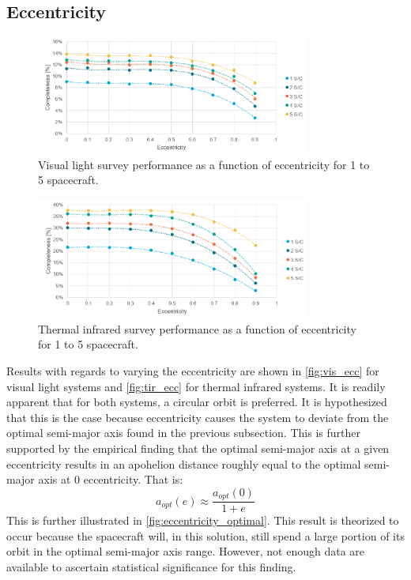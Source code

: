 \subsection{Eccentricity}
\begin{figure}[htbp]
 \centering
 \includegraphics[width=0.8\textwidth]{img/vis_ecc.png}
 \caption{Visual light survey performance as a function of eccentricity for 1 to 5 spacecraft.}
 \label{fig:vis_ecc}
\end{figure}

\begin{figure}[htbp]
 \centering
 \includegraphics[width=0.8\textwidth]{img/tir_ecc.png}
 \caption{Thermal infrared survey performance as a function of eccentricity for 1 to 5 spacecraft.}
 \label{fig:tir_ecc}
\end{figure}

Results with regards to varying the eccentricity are shown in \autoref{fig:vis_ecc} for visual light systems and \autoref{fig:tir_ecc} for thermal infrared systems. It is readily apparent that for both systems, a circular orbit is preferred. It is hypothesized that this is the case because eccentricity causes the system to deviate from the optimal semi-major axis found in the previous subsection. This is further supported by the empirical finding that the optimal semi-major axis at a given eccentricity results in an apohelion distance roughly equal to the optimal semi-major axis at 0 eccentricity. That is:
\begin{equation}
 a_{opt}(e) \approx \frac{a_{opt}(0)}{1+e}
\end{equation}
This is further illustrated in \autoref{fig:eccentricity_optimal}. This result is theorized to occur because the spacecraft will, in this solution, still spend a large portion of its orbit in the optimal semi-major axis range. However, not enough data are available to ascertain statistical significance for this finding.

